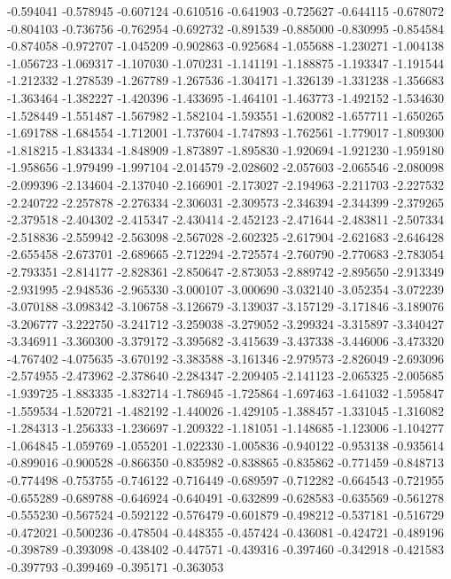 -0.594041
-0.578945
-0.607124
-0.610516
-0.641903
-0.725627
-0.644115
-0.678072
-0.804103
-0.736756
-0.762954
-0.692732
-0.891539
-0.885000
-0.830995
-0.854584
-0.874058
-0.972707
-1.045209
-0.902863
-0.925684
-1.055688
-1.230271
-1.004138
-1.056723
-1.069317
-1.107030
-1.070231
-1.141191
-1.188875
-1.193347
-1.191544
-1.212332
-1.278539
-1.267789
-1.267536
-1.304171
-1.326139
-1.331238
-1.356683
-1.363464
-1.382227
-1.420396
-1.433695
-1.464101
-1.463773
-1.492152
-1.534630
-1.528449
-1.551487
-1.567982
-1.582104
-1.593551
-1.620082
-1.657711
-1.650265
-1.691788
-1.684554
-1.712001
-1.737604
-1.747893
-1.762561
-1.779017
-1.809300
-1.818215
-1.834334
-1.848909
-1.873897
-1.895830
-1.920694
-1.921230
-1.959180
-1.958656
-1.979499
-1.997104
-2.014579
-2.028602
-2.057603
-2.065546
-2.080098
-2.099396
-2.134604
-2.137040
-2.166901
-2.173027
-2.194963
-2.211703
-2.227532
-2.240722
-2.257878
-2.276334
-2.306031
-2.309573
-2.346394
-2.344399
-2.379265
-2.379518
-2.404302
-2.415347
-2.430414
-2.452123
-2.471644
-2.483811
-2.507334
-2.518836
-2.559942
-2.563098
-2.567028
-2.602325
-2.617904
-2.621683
-2.646428
-2.655458
-2.673701
-2.689665
-2.712294
-2.725574
-2.760790
-2.770683
-2.783054
-2.793351
-2.814177
-2.828361
-2.850647
-2.873053
-2.889742
-2.895650
-2.913349
-2.931995
-2.948536
-2.965330
-3.000107
-3.000690
-3.032140
-3.052354
-3.072239
-3.070188
-3.098342
-3.106758
-3.126679
-3.139037
-3.157129
-3.171846
-3.189076
-3.206777
-3.222750
-3.241712
-3.259038
-3.279052
-3.299324
-3.315897
-3.340427
-3.346911
-3.360300
-3.379172
-3.395682
-3.415639
-3.437338
-3.446006
-3.473320
-4.767402
-4.075635
-3.670192
-3.383588
-3.161346
-2.979573
-2.826049
-2.693096
-2.574955
-2.473962
-2.378640
-2.284347
-2.209405
-2.141123
-2.065325
-2.005685
-1.939725
-1.883335
-1.832714
-1.786945
-1.725864
-1.697463
-1.641032
-1.595847
-1.559534
-1.520721
-1.482192
-1.440026
-1.429105
-1.388457
-1.331045
-1.316082
-1.284313
-1.256333
-1.236697
-1.209322
-1.181051
-1.148685
-1.123006
-1.104277
-1.064845
-1.059769
-1.055201
-1.022330
-1.005836
-0.940122
-0.953138
-0.935614
-0.899016
-0.900528
-0.866350
-0.835982
-0.838865
-0.835862
-0.771459
-0.848713
-0.774498
-0.753755
-0.746122
-0.716449
-0.689597
-0.712282
-0.664543
-0.721955
-0.655289
-0.689788
-0.646924
-0.640491
-0.632899
-0.628583
-0.635569
-0.561278
-0.555230
-0.567524
-0.592122
-0.576479
-0.601879
-0.498212
-0.537181
-0.516729
-0.472021
-0.500236
-0.478504
-0.448355
-0.457424
-0.436081
-0.424721
-0.489196
-0.398789
-0.393098
-0.438402
-0.447571
-0.439316
-0.397460
-0.342918
-0.421583
-0.397793
-0.399469
-0.395171
-0.363053
